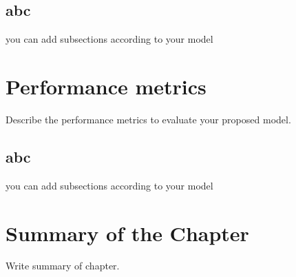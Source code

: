 \subsection{abc}
you can add subsections according to your model

\section{Performance metrics}
Describe the performance metrics to evaluate your proposed model.
\subsection{abc}
you can add subsections according to your model
\section{Summary of the Chapter}

Write summary of chapter.


